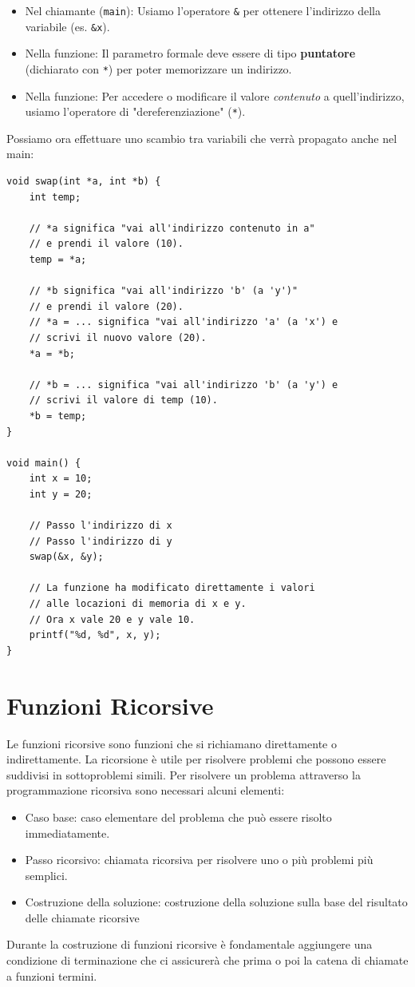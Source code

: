 \documentclass[oneside]{scrbook}
\begin{document}
\begin{itemize}
    \item Nel chiamante (\texttt{main}): Usiamo l'operatore \texttt{\&} per ottenere l'indirizzo della variabile (es. \texttt{\&x}).
    \item Nella funzione: Il parametro formale deve essere di tipo \textbf{puntatore} (dichiarato con \texttt{*}) per poter memorizzare un indirizzo.
    \item Nella funzione: Per accedere o modificare il valore \emph{contenuto} a quell'indirizzo, usiamo l'operatore di "dereferenziazione" (\texttt{*}).
\end{itemize}

Possiamo ora effettuare uno scambio tra variabili che verrà propagato anche nel main:

\begin{lstlisting}[style=cstyle]
void swap(int *a, int *b) {
    int temp;
    
    // *a significa "vai all'indirizzo contenuto in a"
    // e prendi il valore (10).
    temp = *a; 

    // *b significa "vai all'indirizzo 'b' (a 'y')"
    // e prendi il valore (20).
    // *a = ... significa "vai all'indirizzo 'a' (a 'x') e
    // scrivi il nuovo valore (20).
    *a = *b;       
    
    // *b = ... significa "vai all'indirizzo 'b' (a 'y') e 
    // scrivi il valore di temp (10).
    *b = temp;       
}

void main() {
    int x = 10;
    int y = 20;
    
    // Passo l'indirizzo di x 
    // Passo l'indirizzo di y 
    swap(&x, &y); 
    
    // La funzione ha modificato direttamente i valori
    // alle locazioni di memoria di x e y.
    // Ora x vale 20 e y vale 10.
    printf("%d, %d", x, y);
}
\end{lstlisting}

\section{Funzioni Ricorsive}
Le funzioni ricorsive sono funzioni che si richiamano direttamente o indirettamente. La ricorsione è utile per risolvere problemi che possono essere suddivisi in sottoproblemi simili. Per risolvere un problema attraverso la programmazione ricorsiva sono necessari alcuni elementi:
\begin{itemize}
    \item Caso base: caso elementare del problema che può essere
    risolto immediatamente.
    \item Passo ricorsivo: chiamata ricorsiva per risolvere uno o più problemi più semplici.
    \item Costruzione della soluzione: costruzione della soluzione
    sulla base del risultato delle chiamate ricorsive
\end{itemize}
Durante la costruzione di funzioni ricorsive è fondamentale aggiungere una condizione di terminazione che ci assicurerà che prima o poi la catena di chiamate a funzioni termini. 
\end{document}
